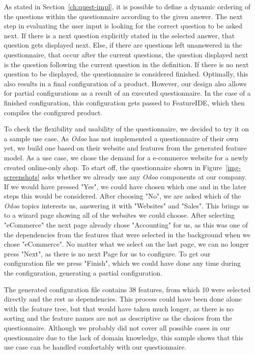 As stated in Section~\ref{ch:quest-impl}, it is possible to define a dynamic ordering of the questions within the questionnaire according to the given answer. The next step in evaluating the user input is looking for the correct question to be asked next. If there is a next question explicitly stated in the selected answer, that question gets displayed next. Else, if there are questions left unanswered in the questionnaire, that occur after the current questions, the question displayed next is the question following the current question in the definition. If there is no next question to be displayed, the questionnaire is considered finished. Optimally, this also results in a final configuration of a product. However, our design also allows for partial configurations as a result of an executed questionnaire. In the case of a finished configuration, this configuration gets passed to FeatureIDE, which then compiles the configured product.

To check the flexibility and usability of the questionnaire, we decided to try it on a sample use case. As \textit{Odoo} has not implemented a questionnaire of their own yet, we build one based on their website and features from the generated feature model. As a use case, we chose the demand for a e-commerce website for a newly created online-only shop. To start off, the questionnaire shown in Figure~\ref{img-screenshots} asks whether we already use any \textit{Odoo} components at our company. If we would have pressed "Yes", we could have chosen which one and in the later steps this would be considered. After choosing "No", we are asked which of the \textit{Odoo} topics interests us, answering it with "Websites" and "Sales". This brings us to a wizard page showing all of the websites we could choose. After selecting "eCommerce" the next page already chose "Accounting" for us, as this was one of the dependencies from the features that were selected in the background when we chose "eCommerce". No matter what we select on the last page, we can no longer press "Next", as there is no next Page for us to configure. To get our configuration file we press "Finish", which we could have done any time during the configuration, generating a partial configuration.

The generated configuration file contains 38 features, from which 10 were selected directly and the rest as dependencies. This process could have been done alone with the feature tree, but that would have taken much longer, as there is no sorting and the feature names are not as descriptive as the choices from the questionnaire. Although we probably did not cover all possible cases in our questionnaire due to the lack of domain knowledge, this sample shows that this use case can be handled comfortably with our questionnaire.